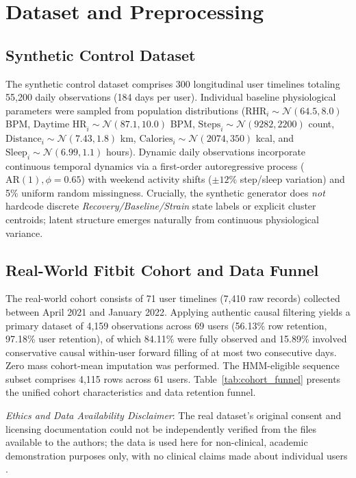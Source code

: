 \documentclass[conference]{IEEEtran}
\begin{document}
\section{Dataset and Preprocessing}

\subsection{Synthetic Control Dataset}
The synthetic control dataset comprises 300 longitudinal user timelines totaling 55,200 daily observations (184 days per user). Individual baseline physiological parameters were sampled from population distributions ($\text{RHR}_i \sim \mathcal{N}(64.5, 8.0)$ BPM, $\text{Daytime HR}_i \sim \mathcal{N}(87.1, 10.0)$ BPM, $\text{Steps}_i \sim \mathcal{N}(9282, 2200)$ count, $\text{Distance}_i \sim \mathcal{N}(7.43, 1.8)$ km, $\text{Calories}_i \sim \mathcal{N}(2074, 350)$ kcal, and $\text{Sleep}_i \sim \mathcal{N}(6.99, 1.1)$ hours). Dynamic daily observations incorporate continuous temporal dynamics via a first-order autoregressive process ($\text{AR}(1), \phi=0.65$) with weekend activity shifts ($\pm 12\%$ step/sleep variation) and 5\% uniform random missingness. Crucially, the synthetic generator does \emph{not} hardcode discrete \textit{Recovery/Baseline/Strain} state labels or explicit cluster centroids; latent structure emerges naturally from continuous physiological variance.

\subsection{Real-World Fitbit Cohort and Data Funnel}
The real-world cohort consists of 71 user timelines (7,410 raw records) collected between April 2021 and January 2022. Applying authentic causal filtering yields a primary dataset of 4,159 observations across 69 users (56.13\% row retention, 97.18\% user retention), of which 84.11\% were fully observed and 15.89\% involved conservative causal within-user forward filling of at most two consecutive days. Zero mass cohort-mean imputation was performed. The HMM-eligible sequence subset comprises 4,115 rows across 61 users. Table~\ref{tab:cohort_funnel} presents the unified cohort characteristics and data retention funnel.

\textit{Ethics and Data Availability Disclaimer}: The real dataset's original consent and licensing documentation could not be independently verified from the files available to the authors; the data is used here for non-clinical, academic demonstration purposes only, with no clinical claims made about individual users \cite{birnbaum2020}.
\end{document}
